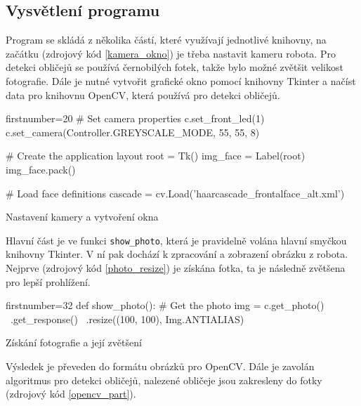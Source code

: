 \documentclass[12pt,notitlepage]{report}
\newcommand{\code}[1]{\texttt{\small #1}}
\begin{document}
\subsection{Vysvětlení programu}

Program se skládá z několika částí, které využívají jednotlivé knihovny, na
začátku (zdrojový kód \ref{kamera_okno}) je třeba nastavit kameru robota. Pro
detekci obličejů se používá černobilých fotek, takže bylo možné zvětšit
velikost fotografie. Dále je nutné vytvořit grafické okno pomocí knihovny
Tkinter a načíst data pro knihovnu OpenCV, která používá pro detekci obličejů.

\begin{listing}
\begin{pyc*}{firstnumber=20}
# Set camera properties
c.set_front_led(1)
c.set_camera(Controller.GREYSCALE_MODE, 55, 55, 8)

# Create the application layout
root = Tk()
img_face = Label(root)
img_face.pack()

# Load face definitions
cascade = cv.Load('haarcascade_frontalface_alt.xml')
\end{pyc*}
\caption{Nastavení kamery a vytvoření okna}
\label{kamera_okno}
\end{listing}

Hlavní část je ve funkci \code{show\_photo}, která je pravidelně volána hlavní
smyčkou knihovny Tkinter. V ní pak dochází k zpracování a zobrazení obrázku z
robota. Nejprve (zdrojový kód \ref{photo_resize}) je získána fotka, ta je
následně zvětšena pro lepší prohlížení.

\begin{listing}
\begin{pyc*}{firstnumber=32}
def show_photo():
    # Get the photo
    img = c.get_photo() \
        .get_response() \
        .resize((100, 100), Img.ANTIALIAS)
\end{pyc*}
\caption{Získání fotografie a její zvětšení}
\label{photo_resize}
\end{listing}

Výsledek je převeden do formátu obrázků pro OpenCV. Dále je zavolán algoritmus
pro detekci obličejů, nalezené obličeje jsou zakresleny do fotky (zdrojový kód
\ref{opencv_part}).
\end{document}
